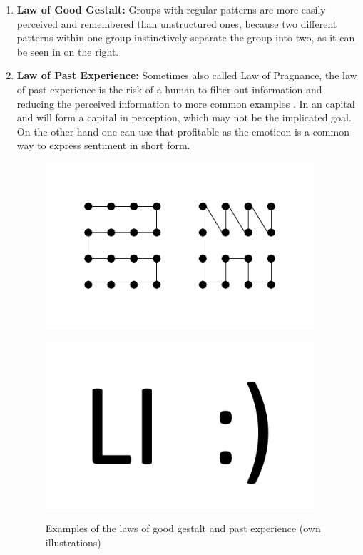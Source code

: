\begin{enumerate}
    \item \textbf{Law of Good Gestalt:} Groups with regular patterns are more easily perceived and remembered than unstructured ones, because two different patterns within one group instinctively separate the group into two, as it can be seen in  \parencite{Todorovic.2008} on the right. 
    
    \item \textbf{Law of Past Experience:} Sometimes also called Law of Pragnance, the law of past experience is the risk of a human to filter out information and reducing the perceived information to more common examples \parencite{Stevenson.n.y.}. In  an capital  and  will form a capital  in perception, which may not be the implicated goal. On the other hand one can use that profitable as the emoticon is a common way to express sentiment in short form.
    
    \begin{figure}[H] 
        \begin{minipage}[b]{.5\linewidth}
            \centering\includegraphics[width=0.94\textwidth]{img/gestalt.pdf}
            \label{fig:gest}
        \end{minipage}%
        \begin{minipage}[b]{.5\linewidth}
            \centering\includegraphics[width=0.94\textwidth]{img/experience.pdf}
            \label{fig:exo}
        \end{minipage}
        \caption[Laws of Good Gestalt and Past Experience]{Examples of the laws of good gestalt and past experience (own illustrations)}\label{fig:law4}
    \end{figure}
\end{enumerate}


